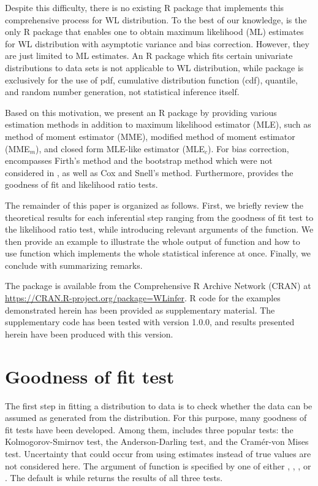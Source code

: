 Despite this difficulty, there is no existing R package that implements this comprehensive process for WL distribution. To the best of our knowledge,  \citep{mtools:2017} is the only R package that enables one to obtain maximum likelihood (ML) estimates for WL distribution with  asymptotic variance and bias correction. However, they are just limited to ML estimates. An R package  \citep{fitdistrplus:2015} which fits certain univariate distributions to data sets is not applicable to WL distribution, while   package \citep{lindleyr} is exclusively for the use of pdf, cumulative distribution function (cdf), quantile, and random number generation, not statistical inference itself.

Based on this motivation, we present an R package  by providing various estimation methods in addition to maximum likelihood estimator (MLE), such as  method of moment estimator (MME), modified method of moment estimator (MME$_m$), and closed form MLE-like estimator (MLE$_c$). For bias correction,  encompasses Firth's method and the bootstrap method which were not considered in , as well as Cox and Snell's method. Furthermore,  provides the goodness of fit and likelihood ratio tests.

The remainder of this paper is organized as follows. First, we briefly review the theoretical results for each inferential step ranging from the goodness of fit test to the likelihood ratio test, while introducing relevant arguments of the  function. We then provide an example to illustrate the whole output of  function and how to use  function which implements the whole statistical inference at once. Finally, we conclude with summarizing remarks.

The  package is available from the Comprehensive R Archive Network (CRAN) at \url{https://CRAN.R-project.org/package=WLinfer}. R code for the examples demonstrated herein has been provided as supplementary material. The supplementary code has been tested with  version 1.0.0, and results presented herein have been produced with this version.





\section{Goodness of fit test}
The first step in fitting a distribution to data is to check whether the data can be assumed as generated from the distribution. For this purpose, many goodness of fit tests have been developed. Among them,  includes three popular tests: the Kolmogorov-Smirnov test, the Anderson-Darling test, and the Cramér-von Mises test. Uncertainty that could occur from using estimates instead of true values are not considered here. The argument  of  function is specified by one of either , , , or . The default is  while  returns the results of all three tests.





